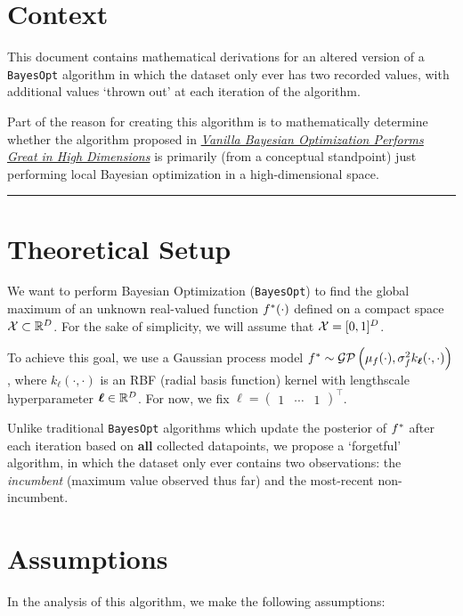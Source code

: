 \documentclass[11pt]{article}
\numberwithin{figure}{section}
\numberwithin{equation}{section}
\def\BayesOpt{\texttt{BayesOpt}}
\def\calGP{\mathcal{GP}}
\newcommand{\bs}[1]{\boldsymbol{#1}}
\def\bell{\bs{\ell}}
\begin{document}
\section{Context}

This document contains mathematical derivations for an altered version of a \BayesOpt{} algorithm in which the dataset only ever has two recorded values, with additional values `thrown out' at each iteration of the algorithm.

Part of the reason for creating this algorithm is to mathematically determine whether the algorithm proposed in \href{https://arxiv.org/abs/2402.02229}{\textit{Vanilla Bayesian Optimization Performs Great in High Dimensions}} is primarily (from a conceptual standpoint) just performing local Bayesian optimization in a high-dimensional space.
\noindent\rule{\textwidth}{0.8pt}

\section{Theoretical Setup}

We want to perform Bayesian Optimization (\BayesOpt) to find the global maximum of an unknown real-valued function $f^{*}(\cdot)$ defined on a compact space $\mathcal{X} \subset \mathbb{R}^{D}$. For the sake of simplicity, we will assume that $\mathcal{X} = [0,1]^{D}$.

To achieve this goal, we use a Gaussian process model $\fstar \sim \calGP\left(\mu_{f}(\cdot), \sigma_{f}^{2}k_{\bell}(\cdot, \cdot)\right)$, where $k_{\bell}(\cdot, \cdot)$ is an RBF (radial basis function) kernel with lengthscale hyperparameter $\bell \in \bbR^{D}$. For now, we fix $\bell = \begin{pmatrix}1 & \cdots & 1\end{pmatrix}^{\top}$.

Unlike traditional \BayesOpt{} algorithms which update the posterior of $f^{*}$ after each iteration based on \textbf{all} collected datapoints, we propose a `forgetful' algorithm, in which the dataset only ever contains two observations: the \textit{incumbent} (maximum value observed thus far) and the most-recent non-incumbent.

\section{Assumptions}

In the analysis of this algorithm, we make the following assumptions:
\end{document}
